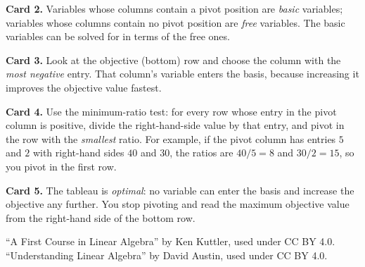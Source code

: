 \documentclass[11pt]{article}
\begin{document}
\begin{cardbox}
\textbf{Card 2.} Variables whose columns contain a pivot position are \emph{basic} variables; variables whose columns contain no pivot position are \emph{free} variables. The basic variables can be solved for in terms of the free ones.
\end{cardbox}

\begin{cardbox}
\textbf{Card 3.} Look at the objective (bottom) row and choose the column with the \emph{most negative} entry. That column's variable enters the basis, because increasing it improves the objective value fastest.
\end{cardbox}

\begin{cardbox}
\textbf{Card 4.} Use the minimum-ratio test: for every row whose entry in the pivot column is positive, divide the right-hand-side value by that entry, and pivot in the row with the \emph{smallest} ratio. For example, if the pivot column has entries $5$ and $2$ with right-hand sides $40$ and $30$, the ratios are $40/5 = 8$ and $30/2 = 15$, so you pivot in the first row.
\end{cardbox}

\begin{cardbox}
\textbf{Card 5.} The tableau is \emph{optimal}: no variable can enter the basis and increase the objective any further. You stop pivoting and read the maximum objective value from the right-hand side of the bottom row.
\end{cardbox}

\vfill

{\small\color{gray}
``A First Course in Linear Algebra'' by Ken Kuttler, used under CC BY 4.0.\\
``Understanding Linear Algebra'' by David Austin, used under CC BY 4.0.
}

\end{document}
